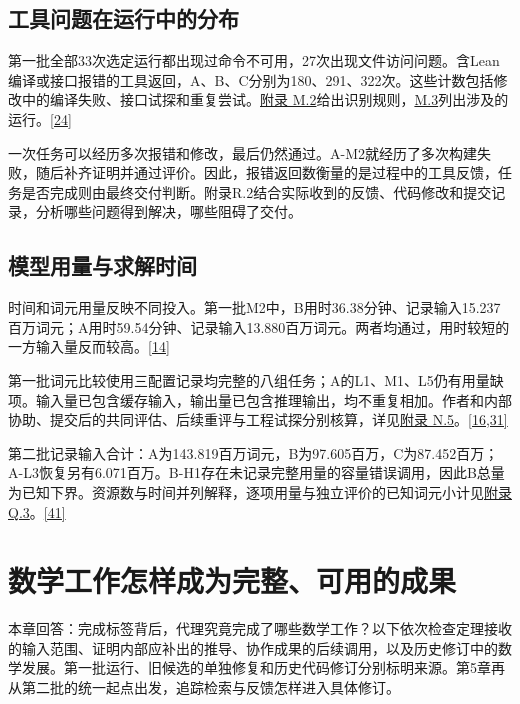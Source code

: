 \subsection[工具问题在运行中的分布]{\texorpdfstring{\protect\hypertarget{section-3-3}{}工具问题在运行中的分布}{工具问题在运行中的分布}}
第一批全部33次选定运行都出现过命令不可用，27次出现文件访问问题。含Lean编译或接口报错的工具返回，A、B、C分别为180、291、322次。这些计数包括修改中的编译失败、接口试探和重复尝试。\href{zh-appendix.pdf\#m2}{附录 M.2}给出识别规则，\href{zh-appendix.pdf\#m3}{M.3}列出涉及的运行。\hyperlink{ref-24}{\mbox{[24]}}

一次任务可以经历多次报错和修改，最后仍然通过。A-M2就经历了多次构建失败，随后补齐证明并通过评价。因此，报错返回数衡量的是过程中的工具反馈，任务是否完成则由最终交付判断。附录R.2结合实际收到的反馈、代码修改和提交记录，分析哪些问题得到解决，哪些阻碍了交付。

\subsection[模型用量与求解时间]{\texorpdfstring{\protect\hypertarget{section-3-4}{}模型用量与求解时间}{模型用量与求解时间}}
时间和词元用量反映不同投入。第一批M2中，B用时36.38分钟、记录输入15.237百万词元；A用时59.54分钟、记录输入13.880百万词元。两者均通过，用时较短的一方输入量反而较高。\hyperlink{ref-14}{\mbox{[14]}}

第一批词元比较使用三配置记录均完整的八组任务；A的L1、M1、L5仍有用量缺项。输入量已包含缓存输入，输出量已包含推理输出，均不重复相加。作者和内部协助、提交后的共同评估、后续重评与工程试探分别核算，详见\href{zh-appendix.pdf\#n5}{附录 N.5}。\hyperlink{ref-16}{\mbox{[16,31]}}

第二批记录输入合计：A为143.819百万词元，B为97.605百万，C为87.452百万；A-L3恢复另有6.071百万。B-H1存在未记录完整用量的容量错误调用，因此B总量为已知下界。资源数与时间并列解释，逐项用量与独立评价的已知词元小计见\href{zh-appendix.pdf\#q3}{附录Q.3}。\hyperlink{ref-41}{\mbox{[41]}}

\section[数学工作怎样成为完整、可用的成果]{\texorpdfstring{\protect\hypertarget{section-4}{}数学工作怎样成为完整、可用的成果}{数学工作怎样成为完整、可用的成果}}
本章回答：完成标签背后，代理究竟完成了哪些数学工作？以下依次检查定理接收的输入范围、证明内部应补出的推导、协作成果的后续调用，以及历史修订中的数学发展。第一批运行、旧候选的单独修复和历史代码修订分别标明来源。第5章再从第二批的统一起点出发，追踪检索与反馈怎样进入具体修订。

